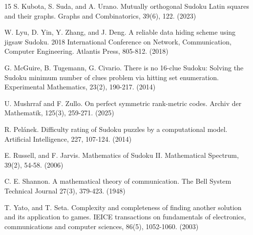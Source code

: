 \documentclass{article}
\theoremstyle{definition}
\begin{document}
\begin{thebibliography}{15}
	 S. Kubota, S. Suda, and A. Urano. Mutually orthogonal Sudoku Latin squares and their graphs. Graphs and Combinatorics, 39(6), 122. (2023)

     W. Lyu, D. Yin, Y. Zhang, and J. Deng. A reliable data hiding scheme using jigsaw Sudoku. 2018 International Conference on Network, Communication, Computer Engineering. Atlantis Press, 805-812. (2018)

     G. McGuire, B. Tugemann, G. Civario. There is no 16-clue Sudoku: Solving the Sudoku minimum number of clues problem via hitting set enumeration. Experimental Mathematics, 23(2), 190-217. (2014)

     U. Mushrraf and F. Zullo. On perfect symmetric rank-metric codes. Archiv der Mathematik, 125(3), 259-271. (2025)

     R. Pel\'{a}nek. Difficulty rating of Sudoku puzzles by a computational model. Artificial Intelligence, 227, 107-124. (2014)

	 E. Russell, and F. Jarvis. Mathematics of Sudoku II. Mathematical Spectrum, 39(2), 54-58. (2006)

     C. E. Shannon. A mathematical theory of communication. The Bell System Technical Journal 27(3), 379-423. (1948)
	
	 T. Yato, and T. Seta. Complexity and completeness of finding another solution and its application to games. IEICE transactions on fundamentals of electronics, communications and computer sciences, 86(5), 1052-1060. (2003)
    \end{thebibliography}
\end{document}
